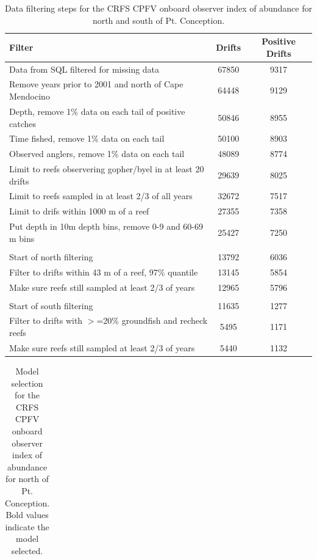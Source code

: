 \documentclass[12pt,]{article}
\begin{document}
\begin{table}[ht]
\centering
\caption{Data filtering steps for the CRFS CPFV onboard observer 
                                        index of abundance for north and south of Pt. Conception.} 
\label{tab:Fleet6_7_Filter}
\begin{tabular}{lcc}
  \hline
Filter & Drifts & Positive Drifts \\ 
  \hline
Data from SQL filtered for missing data & 67850 & 9317 \\ 
  Remove years prior to 2001 and north of Cape Mendocino & 64448 & 9129 \\ 
  Depth, remove 1\% data on each tail of positive catches & 50846 & 8955 \\ 
  Time fished, remove 1\% data on each tail & 50100 & 8903 \\ 
  Observed anglers, remove 1\% data on each tail & 48089 & 8774 \\ 
  Limit to reefs observering gopher/byel in at least 20 drifts & 29639 & 8025 \\ 
  Limit to reefs sampled in at least 2/3 of all years & 32672 & 7517 \\ 
  Limit to drifs within 1000 m of a reef & 27355 & 7358 \\ 
  Put depth in 10m depth bins, remove 0-9 and 60-69 m bins & 25427 & 7250 \\ 
   &  &  \\ 
  Start of north filtering & 13792 & 6036 \\ 
  Filter to drifts within 43 m of a reef, 97\% quantile & 13145 & 5854 \\ 
  Make sure reefs still sampled at least 2/3 of years & 12965 & 5796 \\ 
   &  &  \\ 
  Start of south filtering & 11635 & 1277 \\ 
  Filter to drifts with $>$=20\% groundfish and recheck reefs & 5495 & 1171 \\ 
  Make sure reefs still sampled at least 2/3 of years & 5440 & 1132 \\ 
   \hline
\end{tabular}
\end{table}\begin{table}[ht]
\centering
\caption{Model selection for the CRFS CPFV onboard observer 
                                        index of abundance for north of Pt. Conception. Bold 
                                        values indicate the model selected.} 
\label{tab:Fleet6_AIC}
\begin{tabular}{lll}

\end{tabular}
\end{table}
\end{document}
